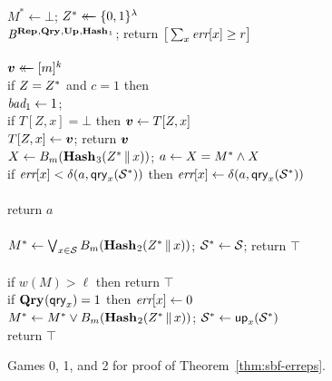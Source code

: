 \begin{figure*}
{
  \vspace{-7pt}
  \hfill {}\\[2pt]
    $M^* \gets \bot$;
    $Z^* \mathrel{\leftarrow\mkern-14mu\leftarrow} \{0,1\}^\lambda$\\
    $\mathit{B}^{\textup{\textbf{Rep}}\hspace{0.5pt},\textup{\textbf{Qry}}\hspace{0.5pt},\textup{\textbf{Up}}\hspace{0.5pt},\textup{\textbf{Hash}}\hspace{0.5pt}_1}$;
    return $\big[\sum_x \textit{err}[x] \geq r\big]$
  \\[6pt]
  \\[2pt]
    $\v.v \getsr [m]^k$\\
    if $Z=Z^*$ and $c = 1$ then \\
    \tab $\textit{bad}_1 \gets 1$; \\
    if $T[Z,x] = \bot$ then $\v.v \gets T[Z,x]$\\
    $T[Z,x] \gets \v.v$; return $\v.v$
}
{
  \\[2pt]
    $X \gets {B}_m(\textup{\textbf{Hash}}\hspace{0.5pt}_3(Z^* \, \| \, x))$;
    $a \gets X = M^* \wedge X$\\
    if $\textit{err}[x] < \delta(a,\mathsf{qry}_x(\mathcal{S}^*))$ then
          $\textit{err}[x] \gets \delta(a,\mathsf{qry}_x(\mathcal{S}^*))$\\
    \\
    return $a$
  \\[6pt]
  \oraclev{$\REPO(\col)$}\\[2pt]
    $M^* \gets \bigvee_{x \in \mathcal{S}} {B}_m(\textup{\textbf{Hash}}\hspace{0.5pt}_2(Z^* \, \| \, x))$;
    $\mathcal{S}^* \gets \mathcal{S}$;
    return $\top$
  \\[6pt]
  \\[2pt]
    if $w(M) > \ell$ then return $\top$\\
    if $\textup{\textbf{Qry}}\hspace{0.5pt}(\mathsf{qry}_x) = 1$ then $\textit{err}[x] \gets 0$\\
    $M^* \gets M^* \vee {B}_m(\textup{\textbf{Hash}}\hspace{0.5pt}_2(Z^* \, \| \, x))$;
    $\mathcal{S}^* \gets \mathsf{up}_x(\mathcal{S}^*)$\\
    return $\top$
}
\caption{Games 0, 1, and 2 for proof of Theorem~\ref{thm:sbf-erreps}.}
\label{fig:sbf-erreps/games}
\end{figure*}


